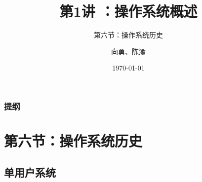 


\title[第1讲]{第1讲 ：操作系统概述} %
\subtitle{第六节：操作系统历史}
\author{向勇、陈渝} %
\date{\today} %



\begin{frame}
\titlepage %
\end{frame}

\begin{frame}
\frametitle{提纲} %
\tableofcontents %
\end{frame}


\section{第六节：操作系统历史} %
\subsection{单用户系统}

